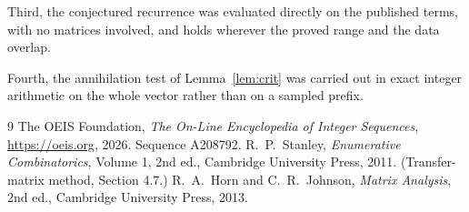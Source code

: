 \documentclass[11pt,a4paper]{article}
\theoremstyle{plain}
\theoremstyle{definition}
\begin{document}
Third, the conjectured recurrence was evaluated directly on the published terms, with no
matrices involved, and holds wherever the proved range and the data overlap.

Fourth, the annihilation test of Lemma~\ref{lem:crit} was carried out in exact integer
arithmetic on the whole vector rather than on a sampled prefix.

\begin{thebibliography}{9}
 The OEIS Foundation, \emph{The On-Line Encyclopedia of Integer
Sequences}, \url{https://oeis.org}, 2026. Sequence A208792.
 R.~P.~Stanley, \emph{Enumerative Combinatorics}, Volume 1, 2nd ed.,
Cambridge University Press, 2011. (Transfer-matrix method, Section 4.7.)
 R.~A.~Horn and C.~R.~Johnson, \emph{Matrix Analysis}, 2nd ed., Cambridge
University Press, 2013.
\end{thebibliography}
\end{document}

